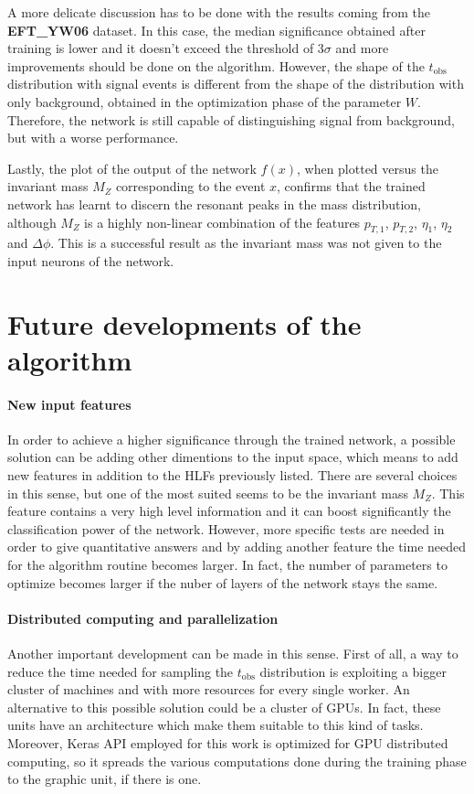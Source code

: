 A more delicate discussion has to be done with the results coming from the \textbf{EFT\_YW06} dataset. In this case, the median significance obtained after training is lower and it doesn't exceed the threshold of $3\sigma$ and more improvements should be done on the algorithm. However, the shape of the $t_\mathrm{obs}$ distribution with signal events is different from the shape of the distribution with only background, obtained in the optimization phase of the parameter $W$. Therefore, the network is still capable of distinguishing signal from background, but with a worse performance.

Lastly, the plot of the output of the network $f(x)$, when plotted versus the invariant mass $M_{Z}$ corresponding to the event $x$, confirms that the trained network has learnt to discern the resonant peaks in the mass distribution, although $M_{Z}$ is a highly non-linear combination of the features $p_{T,1}$, $p_{T,2}$, $\eta_{1}$, $\eta_{2}$ and $\Delta \phi$. This is a successful result as the invariant mass was not given to the input neurons of the network.





\section{Future developments of the algorithm}
\label{sec:FUTURE_DEVELOPMENTS}

\paragraph*{New input features}
In order to achieve a higher significance through the trained network, a possible solution can be adding other dimentions to the input space, which means to add new features in addition to the HLFs previously listed. There are several choices in this sense, but one of the most suited seems to be the invariant mass $M_{Z}$. This feature contains a very high level information and it can boost significantly the classification power of the network. However, more specific tests are needed in order to give quantitative answers and by adding another feature the time needed for the algorithm routine becomes larger. In fact, the number of parameters to optimize becomes larger if the nuber of layers of the network stays the same.

\paragraph*{Distributed computing and parallelization}
Another important development can be made in this sense. First of all, a way to reduce the time needed for sampling the $t_\mathrm{obs}$ distribution is exploiting a bigger cluster of machines and with more resources for every single worker. An alternative to this possible solution could be a cluster of GPUs. In fact, these units have an architecture which make them suitable to this kind of tasks. Moreover, Keras API employed for this work is optimized for GPU distributed computing, so it spreads the various computations done during the training phase to the graphic unit, if there is one.

